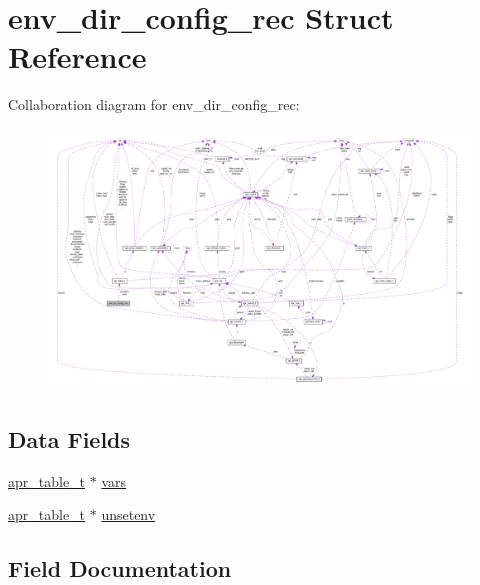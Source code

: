 \hypertarget{structenv__dir__config__rec}{}\section{env\+\_\+dir\+\_\+config\+\_\+rec Struct Reference}
\label{structenv__dir__config__rec}


Collaboration diagram for env\+\_\+dir\+\_\+config\+\_\+rec\+:
\nopagebreak
\begin{figure}[H]
\begin{center}
\leavevmode
\includegraphics[width=350pt]{structenv__dir__config__rec__coll__graph}
\end{center}
\end{figure}
\subsection*{Data Fields}
\begin{DoxyCompactItemize}
\item 
\hyperlink{structapr__table__t}{apr\+\_\+table\+\_\+t} $\ast$ \hyperlink{structenv__dir__config__rec_ad29cc4d037b30908a4fd2a68ecf31f83}{vars}
\item 
\hyperlink{structapr__table__t}{apr\+\_\+table\+\_\+t} $\ast$ \hyperlink{structenv__dir__config__rec_a5f68109ec6ae6e1cf457ab47aa25a3c1}{unsetenv}
\end{DoxyCompactItemize}


\subsection{Field Documentation}
